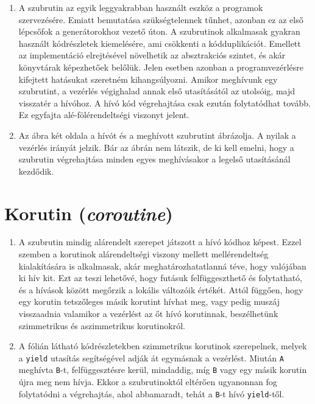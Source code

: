 \documentclass[12pt, a4paper]{article}
\begin{document}
\begin{enumerate}
\item
A szubrutin az egyik leggyakrabban használt eszköz a programok szervezésére. Emiatt bemutatása szükségtelennek tűnhet, azonban ez az első lépcsőfok a generátorokhoz vezető úton. A szubrutinok alkalmasak gyakran használt kódrészletek kiemelésére, ami csökkenti a kódduplikációt. Emellett az implementáció elrejtésével növelhetik az absztrakciós szintet, és akár könyvtárak képezhetőek belőlük. Jelen esetben azonban a programvezérlésre kifejtett hatásukat szeretném kihangsúlyozni. Amikor meghívunk egy szubrutint, a vezérlés végighalad annak első utasításától az utolsóig, majd visszatér a hívóhoz. A hívó kód végrehajtása csak ezután folytatódhat tovább. Ez egyfajta alé-fölérendeltségi viszonyt jelent.
\item
Az ábra két oldala a hívót és a meghívott szubrutint ábrázolja. A nyilak a vezérlés irányát jelzik. Bár az ábrán nem látszik, de ki kell emelni, hogy a szubrutin végrehajtása minden egyes meghívásakor a legelső utasításánál kezdődik.
\end{enumerate}

\section{Korutin (\textit{coroutine})}

\begin{enumerate}
\item
A szubrutin mindig alárendelt szerepet játszott a hívó kódhoz képest. Ezzel szemben a korutinok alárendeltségi viszony mellett mellérendeltség kialakítására is alkalmasak, akár meghatározhatatlanná téve, hogy valójában ki hív kit. Ezt az teszi lehetővé, hogy futásuk felfüggeszthető és folytatható, és a hívások között megőrzik a lokális változóik értékét. Attól függően, hogy egy korutin tetszőleges másik korutint hívhat meg, vagy pedig muszáj visszaadnia valamikor a vezérlést az őt hívó korutinnak, beszélhetünk szimmetrikus és aszimmetrikus korutinokról.
\item
A fólián látható kódrészletekben szimmetrikus korutinok szerepelnek, melyek a \texttt{yield} utasítás segítségével adják át egymásnak a vezérlést. Miután \texttt{A} meghívta \texttt{B}-t, felfüggesztésre kerül, mindaddig, míg \texttt{B} vagy egy másik korutin újra meg nem hívja. Ekkor a szubrutinoktól eltérően ugyanonnan fog folytatódni a végrehajtás, ahol abbamaradt, tehát a \texttt{B}-t hívó \texttt{yield}-től.
\end{enumerate}
\end{document}
